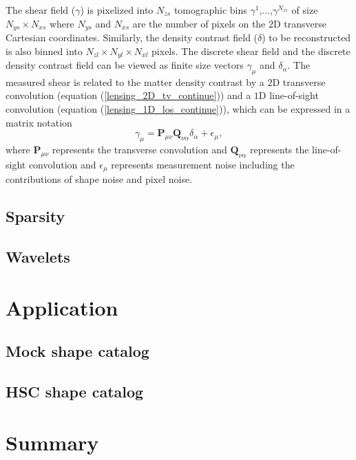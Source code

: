 \documentclass[twocolumn]{aastex62}
\begin{document}
The shear field ($\gamma$) is pixelized into $N_{zs}$ tomographic bins $\gamma^{1}$,...,$\gamma^{N_{zs}}$ of size $N_{ys} \times N_{xs}$ where $N_{ys}$ and $N_{xs}$ are the number of pixels on the $2$D transverse Cartesian coordinates. Similarly, the density contrast field ($\delta$) to be reconstructed is also binned into $N_{zl}\times N_{yl} \times N_{xl}$ pixels. The discrete shear field and the discrete density contrast field can be viewed as finite size vectors $\gamma_\mu$ and $\delta_\alpha$. The measured shear is related to the matter density contrast by a $2$D transverse convolution (equation (\ref{lensing_2D_tv_continue})) and a $1$D line-of-sight convolution (equation (\ref{lensing_1D_los_continue})), which can be expressed in a matrix notation
\begin{equation}
\gamma_{\mu} = \textbf{P}_{\mu \nu} \textbf{Q}_{\nu \alpha} \delta_{\alpha} + \epsilon_{\mu},
\end{equation}
where $\textbf{P}_{\mu \nu}$ represents the transverse convolution and $\textbf{Q}_{\nu \alpha}$ represents the line-of-sight convolution and $\epsilon_{\mu}$ represents measurement noise including the contributions of shape noise and pixel noise.

\subsection{Sparsity}



\subsection{Wavelets}





\section{Application}
\subsection{Mock shape catalog}

\subsection{HSC shape catalog}


\section{Summary}
\end{document}
